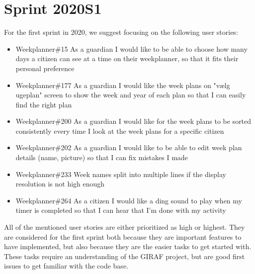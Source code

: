 \section{Sprint 2020S1}
For the first sprint in 2020, we suggest focusing on the following user stories:

\begin{itemize}
    \item Weekplanner\#15 As a guardian I would like to be able to choose how many days a citizen can see at a time on their weekplanner, so that it fits their personal preference 
    \item Weekplanner\#177 As a guardian I would like the week plans on "vælg ugeplan" screen to show the week and year of each plan so that I can easily find the right plan 
    \item Weekplanner\#200 As a guardian I would like for the week plans to be sorted consistently every time I look at the week plans for a specific citizen
    \item Weekplanner\#202 As a guardian I would like to be able to edit week plan details (name, picture) so that I can fix mistakes I made
    \item Weekplanner\#233 Week names split into multiple lines if the display resolution is not high enough 
    \item Weekplanner\#264 As a citizen I would like a ding sound to play when my timer is completed so that I can hear that I'm done with my activity
\end{itemize}
\noindent
All of the mentioned user stories are either prioritized as high or highest. 
They are considered for the first sprint both because they are important features to have implemented, but also because they are the easier tasks to get started with.
These tasks require an understanding of the GIRAF project, but are good first issues to get familiar with the code base.
